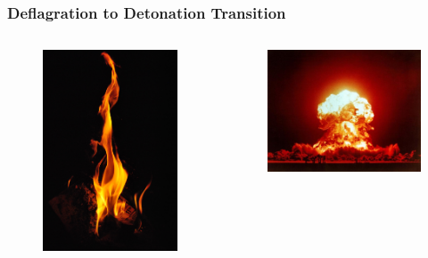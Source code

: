 \documentclass{beamer}
\begin{document}
\begin{frame}
\frametitle{Deflagration to Detonation Transition}

\begin{columns}[c]
\begin{figure}
    \begin{center}
      \includegraphics[width=.70\linewidth]{fire.jpeg}
    \end{center}
  \end{figure}


        \begin{figure}
    \begin{center}
      \includegraphics[width=.90\linewidth]{nuke.jpg}
    \end{center}
  \end{figure}

        \end{columns}

\end{frame}
\end{document}
